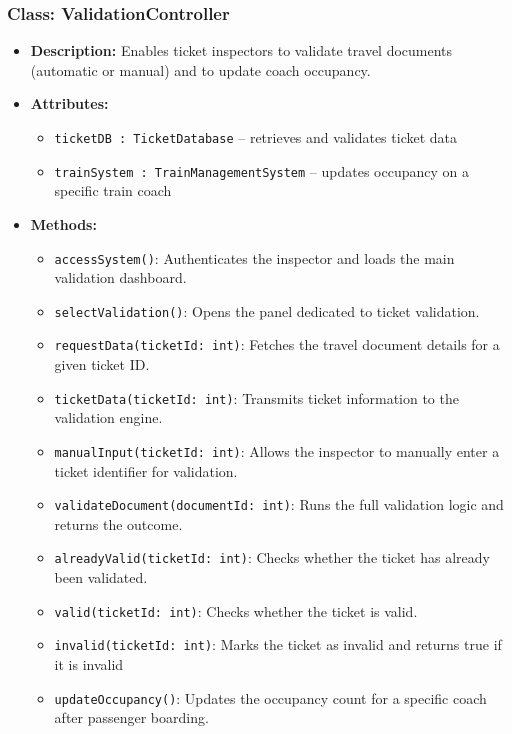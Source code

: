 \documentclass{article}
\begin{document}
\subsubsection*{Class: ValidationController}
\begin{itemize}
    \item \textbf{Description:} Enables ticket inspectors to validate travel documents (automatic or manual) and to update coach occupancy.
    \item \textbf{Attributes:}
    \begin{itemize}
        \item \texttt{ticketDB : TicketDatabase} -- retrieves and validates ticket data
        \item \texttt{trainSystem : TrainManagementSystem} -- updates occupancy on a specific train coach
    \end{itemize}
    \item \textbf{Methods:}
    \begin{itemize}
        \item \texttt{accessSystem()}: Authenticates the inspector and loads the main validation dashboard. 
        \item \texttt{selectValidation()}: Opens the panel dedicated to ticket validation. 
        \item \texttt{requestData(ticketId: int)}: Fetches the travel document details for a given ticket ID.
        \item \texttt{ticketData(ticketId: int)}: Transmits ticket information to the validation engine.
        \item \texttt{manualInput(ticketId: int)}: Allows the inspector to manually enter a ticket identifier for validation. 
        \item \texttt{validateDocument(documentId: int)}: Runs the full validation logic and returns the outcome.
        \item \texttt{alreadyValid(ticketId: int)}:  Checks whether the ticket has already been validated.
        \item \texttt{valid(ticketId: int)}:  Checks whether the ticket is valid.
        \item \texttt{invalid(ticketId: int)}: Marks the ticket as invalid and returns true if it is invalid
        \item \texttt{updateOccupancy()}: Updates the occupancy count for a specific coach after passenger boarding. 
    \end{itemize}
    \begin{table}[H]

\end{table}
\end{itemize}
\end{document}

